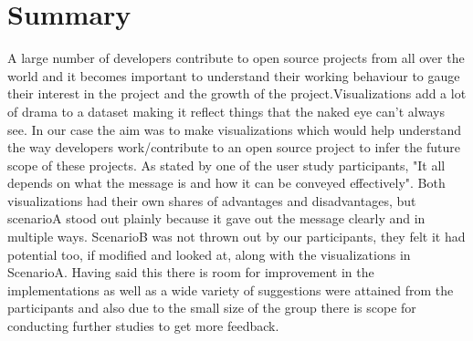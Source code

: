 \documentclass[seploa]{beavtex}
\begin{document}
\chapter{Summary}
A large number of developers contribute to open source projects from all over the world and it becomes important to understand their working behaviour to gauge their interest in the project and the growth of the project.Visualizations add a lot of drama to a dataset making it reflect things that the naked eye can't always see. In our case the aim was to make visualizations which would help understand the way developers work/contribute to an open source project to infer the future scope of these projects. As stated by one of the user study participants, "It all depends on what the message is and how it can be conveyed effectively". Both visualizations had their own shares of advantages and disadvantages, but scenarioA stood out plainly because it gave out the message clearly and in multiple ways. ScenarioB was not thrown out by our participants, they felt it had potential too, if modified and looked at, along with the visualizations in ScenarioA. Having said this there is room for improvement in the implementations as well as a wide variety of suggestions were attained from the participants and also due to the small size of the group there is scope for conducting further studies to get more feedback. 



\end{document}
